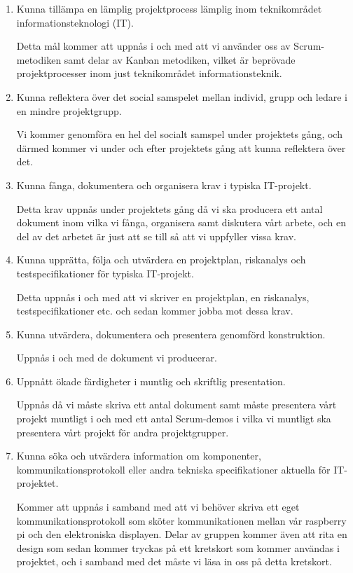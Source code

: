 \documentclass[11pt]{article}
\begin{document}
\begin{enumerate}
\item Kunna tillämpa en lämplig projektprocess lämplig inom teknikområdet
informationsteknologi (IT).

Detta mål kommer att uppnås i och med att vi använder oss av
Scrum-metodiken samt delar av Kanban metodiken, vilket är beprövade
projektprocesser inom just teknikområdet informationsteknik.

\item Kunna reflektera över det social samspelet mellan individ, grupp och
ledare i en mindre projektgrupp.

Vi kommer genomföra en hel del socialt samspel under projektets gång,
och därmed kommer vi under och efter projektets gång att kunna
reflektera över det.

\item Kunna fånga, dokumentera och organisera krav i typiska IT-projekt.

Detta krav uppnås under projektets gång då vi ska producera ett antal
dokument inom vilka vi fånga, organisera samt diskutera vårt arbete, och
en del av det arbetet är just att se till så att vi uppfyller vissa
krav.

\item Kunna upprätta, följa och utvärdera en projektplan, riskanalys och
testspecifikationer för typiska IT-projekt.

Detta uppnås i och med att vi skriver en projektplan, en riskanalys,
testspecifikationer etc. och sedan kommer jobba mot dessa krav.

\item Kunna utvärdera, dokumentera och presentera genomförd konstruktion.

Uppnås i och med de dokument vi producerar.

\item Uppnått ökade färdigheter i muntlig och skriftlig presentation.

Uppnås då vi måste skriva ett antal dokument samt måste presentera vårt
projekt muntligt i och med ett antal Scrum-demos i vilka vi muntligt ska
presentera vårt projekt för andra projektgrupper.

\item Kunna söka och utvärdera information om komponenter,
kommunikationsprotokoll eller andra tekniska specifikationer aktuella
för IT-projektet.

Kommer att uppnås i samband med att vi behöver skriva ett eget
kommunikationsprotokoll som sköter kommunikationen mellan vår raspberry
pi och den elektroniska displayen. Delar av gruppen kommer även att rita
en design som sedan kommer tryckas på ett kretskort som kommer användas
i projektet, och i samband med det måste vi läsa in oss på detta
kretskort.


\end{enumerate}
\end{document}

